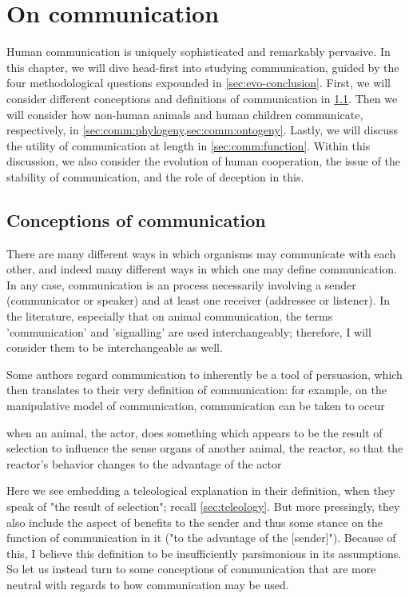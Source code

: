 \chapter{On communication}
\label{ch:communication}

Human communication is uniquely sophisticated and remarkably pervasive.
In this chapter, we will dive head-first into studying communication, guided by the four methodological questions expounded in \cref{sec:evo-conclusion}.
First, we will consider different conceptions and definitions of communication in \cref{sec:comm:definition}. Then we will consider how non-human animals and human children communicate, respectively, in \cref{sec:comm:phylogeny,sec:comm:ontogeny}. Lastly, we will discuss the utility of communication at length in \cref{sec:comm:function}. Within this discussion, we also consider the evolution of human cooperation, the issue of the stability of communication, and the role of deception in this.

\section{Conceptions of communication}
\label{sec:comm:definition}

There are many different ways in which organisms may communicate with each other, and indeed many different ways in which one may define communication. In any case, communication is an process necessarily involving a sender (communicator or speaker) and at least one receiver (addressee or listener). In the literature, especially that on animal communication, the terms 'communication' and 'signalling' are used interchangeably; therefore, I will consider them to be interchangeable as well.

Some authors regard communication to inherently be a tool of persuasion, which then translates to their very definition of communication: for example, on the manipulative model of communication, communication can be taken to occur
\begin{quoting}
    when an animal, the actor, does something which appears to be the result of selection to influence the sense organs of another animal, the reactor, so that the reactor's behavior changes to the advantage of the actor
    \hfill \citep[p.~283]{DawkinsKrebs78}
\end{quoting}
Here we see \citeauthor{DawkinsKrebs78} embedding a teleological explanation in their definition, when they speak of "the result of selection"; recall \cref{sec:teleology}.
But more pressingly, they also include the aspect of benefits to the sender and thus some stance on the function of communication in it ("to the advantage of the [sender]").
Because of this, I believe this definition to be insufficiently parsimonious in its assumptions. So let us instead turn to some conceptions of communication that are more neutral with regards to how communication may be used.

